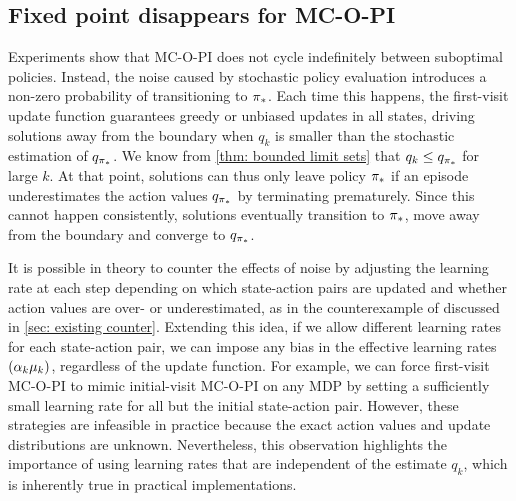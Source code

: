 

\subsection{Fixed point disappears for MC-O-PI}
\label{sec: counter 4s fv}

Experiments show that MC-O-PI does not cycle indefinitely between suboptimal policies.
Instead, the noise caused by stochastic policy evaluation introduces a non-zero probability of transitioning to ${\pi}_*$.
Each time this happens, the first-visit update function guarantees greedy or unbiased updates in all states, driving solutions away from the boundary
when $q_k$ is smaller than the stochastic estimation of $q_{{\pi}_*}$.
We know from \autoref{thm: bounded limit sets} that $q_k \leq q_{{\pi}_*}$ for large $k$. At that point, solutions can thus only leave policy ${\pi}_*$ if an episode underestimates the action values $q_{{\pi}_*}$ by terminating prematurely.
Since this cannot happen consistently,
solutions eventually transition to ${\pi}_*$, move away from the boundary and converge to $q_{{\pi}_*}$.

It is possible in theory to counter the effects of noise by adjusting the learning rate at each step depending on which state-action pairs are updated and whether action values are over- or underestimated, as in the counterexample of \citet{Bertsekas1996Neuro-DynamicProgramming} discussed in \autoref{sec: existing counter}.
Extending this idea, if we allow different learning rates for each state-action pair, we can impose any bias in the effective learning rates $(\alpha_k \mu_k)$, regardless of the update function.
For example, we can force first-visit MC-O-PI to mimic initial-visit MC-O-PI on any MDP by setting a sufficiently small learning rate for all but the initial state-action pair.
However, these strategies are infeasible in practice because the exact action values and update distributions are unknown. Nevertheless, this observation highlights the importance of using learning rates that are independent of the estimate $q_k$, which is inherently true in practical implementations.


